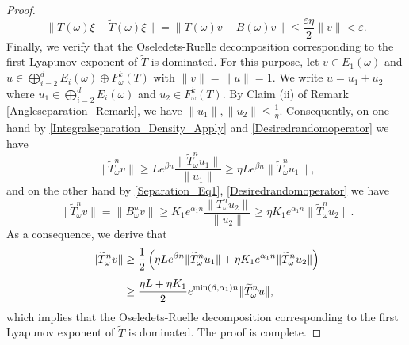 \documentclass[pdflatex,sn-mathphys-num]{sn-jnl}%
\theoremstyle{thmstyleone}%
\theoremstyle{thmstyletwo}%
\theoremstyle{thmstylethree}%
\newcommand{\eps}{\varepsilon}
\numberwithin{equation}{section}
\begin{document}
\begin{proof}
\begin{equation*}
\|T(\omega)\xi-\widetilde T(\omega)\xi\|
= 
\|T(\omega) v- B(\omega) v\|
\leq
\frac{\eps\eta}{2}\|v\|<\eps.
\end{equation*}
 Finally, we verify that the Oseledets-Ruelle decomposition corresponding to the first Lyapunov exponent of  $\widetilde T$ is dominated. For this purpose, let $v\in E_1(\omega)$ and $u \in \bigoplus_{i=2}^dE_i(\omega)\oplus F^k_{\omega}(T)$ with $\|v\|=\|u\|=1$. We write $u=u_1+u_2$ where $u_1\in \bigoplus_{i=2}^dE_i(\omega)$  and $u_2\in F^k_{\omega}(T)$. By Claim (ii) of  Remark \ref{Angleseparation_Remark}, we have
 $\|u_1\|,\|u_2\|\leq \frac{1}{\eta}$. Consequently, on one hand by \eqref{Integralseparation_Density_Apply} and \eqref{Desiredrandomoperator} we have \[
\|\widetilde T^n_{\omega}v\|
\geq Le^{\beta n} \frac{\|\widetilde T^n_{\omega}u_1\|}{\|u_1\|}
\geq \eta L e^{\beta n} \|\widetilde T^n_{\omega}u_1\|,
\]
and on the other hand by \eqref{Separation_Eq1}, \eqref{Desiredrandomoperator} we have 
\[
\|\widetilde T^n_{\omega}v\|
=
\|B^n_{\omega}v\|\geq K_1 e^{\alpha_1 n }\frac{\|T^{n}_{\omega}u_2\|}{\|u_2\|}
\geq 
\eta K_1 e^{\alpha_1 n} \|{\widetilde T}^{n}_{\omega}u_2\|.
\]
As a consequence, we derive that 
\begin{align}
\|\widetilde T^n_{\omega}v\|
& \geq \frac{1}{2}\left(
\eta L e^{\beta n} \|\widetilde T^n_{\omega}u_1\|
+
\eta K_1 e^{\alpha_1 n }\|{\widetilde T}^{n}_{\omega}u_2\|
\right)\notag\\[1ex]
& \geq 
\frac{\eta L + \eta K_1}{2} e^{\min(\beta,\alpha_1)n} \|{\widetilde T}^n_{\omega}u\|,\notag
\end{align}
which implies that the Oseledets-Ruelle decomposition corresponding to the first Lyapunov exponent of  $\widetilde T$ is dominated. The proof is complete.
\end{proof}
%
%
%
%
\end{document}

